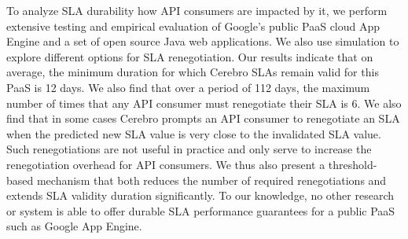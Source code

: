 
To analyze SLA durability how API consumers are 
impacted by it, we perform extensive testing and empirical evaluation
of Google's public PaaS cloud App Engine and a set of open source Java web applications.  
We also use simulation to explore different options for SLA renegotiation.
Our results indicate that on average, the minimum duration for which Cerebro SLAs 
remain valid for this PaaS is 12 days.  We also find that
over a period of 112 days, the maximum number of times that any API consumer must renegotiate
their SLA is 6.  We also find that in some cases Cerebro prompts an API consumer to
renegotiate an SLA when the predicted new SLA value is very close to the invalidated SLA value. 
Such renegotiations are not useful in practice and only serve to increase the renegotiation overhead
for API consumers. We thus also present a threshold-based mechanism that both reduces 
the number of required renegotiations and extends SLA validity duration
significantly.  To our knowledge, no other research or system is able to offer
durable SLA performance guarantees for a public PaaS such as Google App
Engine.

